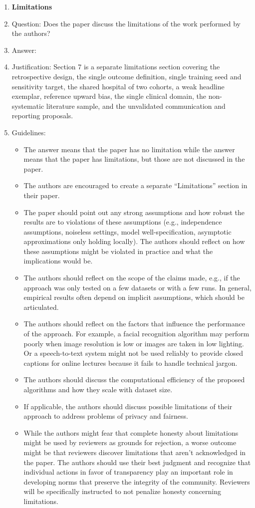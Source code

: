 \begin{enumerate}
\item {\bf Limitations}
    \item[] Question: Does the paper discuss the limitations of the work performed by the authors?
    \item[] Answer: \answerYes{}
    \item[] Justification: Section 7 is a separate limitations section covering the retrospective design, the single outcome definition, single training seed and sensitivity target, the shared hospital of two cohorts, a weak headline exemplar, reference upward bias, the single clinical domain, the non-systematic literature sample, and the unvalidated communication and reporting proposals.
    \item[] Guidelines:
    \begin{itemize}
        \item The answer \answerNA{} means that the paper has no limitation while the answer \answerNo{} means that the paper has limitations, but those are not discussed in the paper. 
        \item The authors are encouraged to create a separate ``Limitations'' section in their paper.
        \item The paper should point out any strong assumptions and how robust the results are to violations of these assumptions (e.g., independence assumptions, noiseless settings, model well-specification, asymptotic approximations only holding locally). The authors should reflect on how these assumptions might be violated in practice and what the implications would be.
        \item The authors should reflect on the scope of the claims made, e.g., if the approach was only tested on a few datasets or with a few runs. In general, empirical results often depend on implicit assumptions, which should be articulated.
        \item The authors should reflect on the factors that influence the performance of the approach. For example, a facial recognition algorithm may perform poorly when image resolution is low or images are taken in low lighting. Or a speech-to-text system might not be used reliably to provide closed captions for online lectures because it fails to handle technical jargon.
        \item The authors should discuss the computational efficiency of the proposed algorithms and how they scale with dataset size.
        \item If applicable, the authors should discuss possible limitations of their approach to address problems of privacy and fairness.
        \item While the authors might fear that complete honesty about limitations might be used by reviewers as grounds for rejection, a worse outcome might be that reviewers discover limitations that aren't acknowledged in the paper. The authors should use their best judgment and recognize that individual actions in favor of transparency play an important role in developing norms that preserve the integrity of the community. Reviewers will be specifically instructed to not penalize honesty concerning limitations.
    \end{itemize}


\end{enumerate}
